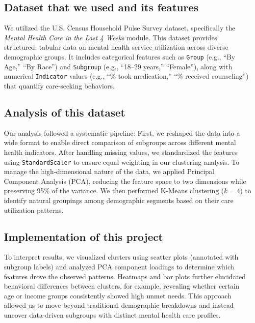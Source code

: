 \documentclass{article}
\begin{document}
\subsection{Dataset that we used and its features}
We utilized the U.S. Census Household Pulse Survey dataset, specifically the \textit{Mental Health Care in the Last 4 Weeks} module. This dataset provides structured, tabular data on mental health service utilization across diverse demographic groups. It includes categorical features such as \texttt{Group} (e.g., ``By Age,'' ``By Race'') and \texttt{Subgroup} (e.g., ``18--29 years,'' ``Female''), along with numerical \texttt{Indicator} values (e.g., ``\% took medication,'' ``\% received counseling'') that quantify care-seeking behaviors.

\subsection{Analysis of this dataset}
Our analysis followed a systematic pipeline: First, we reshaped the data into a wide format to enable direct comparison of subgroups across different mental health indicators. After handling missing values, we standardized the features using \texttt{StandardScaler} to ensure equal weighting in our clustering analysis. To manage the high-dimensional nature of the data, we applied Principal Component Analysis (PCA), reducing the feature space to two dimensions while preserving 95\% of the variance. We then performed K-Means clustering (\(k = 4\)) to identify natural groupings among demographic segments based on their care utilization patterns.


\subsection{Implementation of this project}
To interpret results, we visualized clusters using scatter plots (annotated with subgroup labels) and analyzed PCA component loadings to determine which features drove the observed patterns. Heatmaps and bar plots further elucidated behavioral differences between clusters, for example, revealing whether certain age or income groups consistently showed high unmet needs. This approach allowed us to move beyond traditional demographic breakdowns and instead uncover data-driven subgroups with distinct mental health care profiles.
\end{document}
